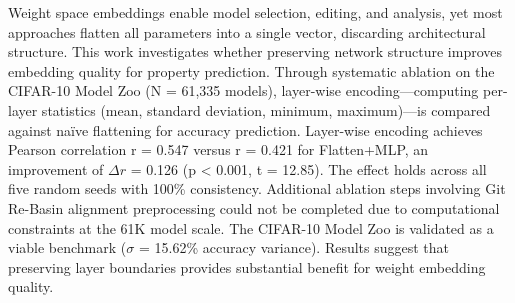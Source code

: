 
Weight space embeddings enable model selection, editing, and analysis, yet most approaches flatten all parameters into a single vector, discarding architectural structure. This work investigates whether preserving network structure improves embedding quality for property prediction. Through systematic ablation on the CIFAR-10 Model Zoo (N = 61,335 models), layer-wise encoding---computing per-layer statistics (mean, standard deviation, minimum, maximum)---is compared against naïve flattening for accuracy prediction. Layer-wise encoding achieves Pearson correlation r = 0.547 versus r = 0.421 for Flatten+MLP, an improvement of $\Delta r$ = 0.126 (p < 0.001, t = 12.85). The effect holds across all five random seeds with 100\% consistency. Additional ablation steps involving Git Re-Basin alignment preprocessing could not be completed due to computational constraints at the 61K model scale. The CIFAR-10 Model Zoo is validated as a viable benchmark ($\sigma$ = 15.62\% accuracy variance). Results suggest that preserving layer boundaries provides substantial benefit for weight embedding quality.
